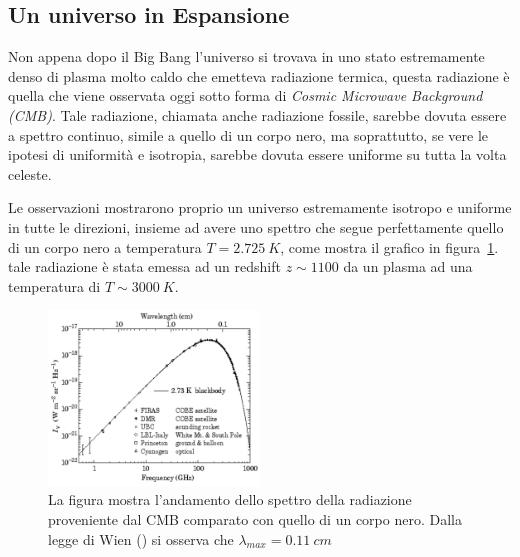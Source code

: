 \subsection{Un universo in Espansione}\label{sec:unverso-espansione}
Non appena dopo il Big Bang l'universo si trovava in uno stato estremamente denso di plasma molto caldo che emetteva radiazione termica, questa radiazione è quella che viene osservata oggi sotto forma di \textit{Cosmic Microwave Background (CMB)}. Tale radiazione, chiamata anche radiazione fossile, sarebbe dovuta essere a spettro continuo, simile a quello di un corpo nero, ma soprattutto, se vere le ipotesi di uniformità e isotropia, sarebbe dovuta essere uniforme su tutta la volta celeste. 

Le osservazioni mostrarono proprio un universo estremamente isotropo e uniforme in tutte le direzioni, insieme ad avere uno spettro che segue perfettamente quello di un corpo nero a temperatura $T = \SI{2.725}{K}$, come mostra il grafico in figura~\ref{fig:balckbody-universe}. tale radiazione è stata emessa ad un redshift $z \sim 1100$ da un plasma ad una temperatura di $T \sim \SI{3000}{K}$.
\begin{figure}
    \centering
    \includegraphics[width = 0.5\textwidth]{immagini/blackbody-universe.png}
    \caption{La figura mostra l'andamento dello spettro della radiazione proveniente dal CMB comparato con quello di un corpo nero. Dalla legge di Wien () si osserva che $\lambda_{max}= \SI{0.11}{cm}$}\label{fig:balckbody-universe}
\end{figure}


